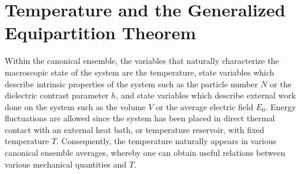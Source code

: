 \documentclass[english,12pt]{ttuthes}
\begin{document}
\section{Temperature and the Generalized Equipartition Theorem}
\label{sec:Can_Temp_Equipartition_Thm}
%
Within the canonical ensemble, the variables that naturally characterize
the macroscopic state of the system are the temperature, state
variables which describe intrinsic properties of the system such as
the particle number $N$ or the dielectric contrast parameter $h$, and state
variables which describe external work done on the system such as the
volume $V$ or the average electric field $E_0$. Energy fluctuations
are allowed since the system has been placed in direct thermal contact
with an external heat bath, or temperature reservoir, with fixed
temperature $T$. Consequently, the temperature naturally appears
in various canonical ensemble averages, whereby one can obtain useful
relations between various mechanical quantities and $T$.
\end{document}

